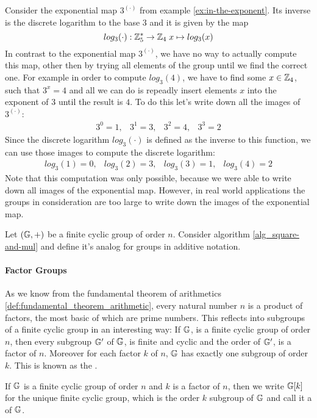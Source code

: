 \begin{example}Consider the exponential map $3^{(\cdot)}$ from example \ref{ex:in-the-exponent}. Its inverse is the discrete logarithm to the base $3$ and it is given by the map 
$$
log_3(\cdot): \mathbb{Z}_5^* \to \mathbb{Z}_4\; x \mapsto log_3(x)
$$ 
In contrast to the exponential map $3^{(\cdot)}$, we have no way to actually compute this map, other then by trying all elements of the group until we find the correct one. For example in order to compute $log_3(4)$, we have to find some $x\in \mathbb{Z}_4$, such that $3^x=4$ and all we can do is repeadly insert elements $x$ into the exponent of $3$ until the result is $4$. To do this let's write down all the images of $3^{(\cdot)}$: 
$$
\begin{array}{cccc}
3^0 = 1, & 3^1 = 3, & 3^2 = 4, & 3^3 = 2
\end{array}
$$
Since the discrete logarithm $log_3(\cdot)$ is defined as the inverse to this function, we can use those images to compute the discrete logarithm:
$$
\begin{array}{ccccc}
log_3(1) = 0, & log_3(2) = 3, & log_3(3) = 1, & log_3(4) = 2
\end{array}
$$
Note that this computation was only possible, because we were able to write down all images of the exponential map. However, in real world applications the groups in consideration are too large to write down the images of the exponential map. 
\end{example}
\begin{exercise} Let $(\mathbb{G},+)$ be a finite cyclic group of order $n$. Consider algorithm \ref{alg_square-and-mul} and define it's analog for groups in additive notation.
\end{exercise}
\paragraph{Factor Groups}
As we know from the fundamental theorem of arithmetics \ref{def:fundamental_theorem_arithmetic}, every natural number $n$ is a product of factors, the most basic of which are prime numbers. This reflects into subgroups of a finite cyclic group in an interesting way: If $\mathbb{G}$, is a finite cyclic group of order $n$, then every subgroup $\mathbb{G}'$ of $\mathbb{G}$, is finite and cyclic and the order of $\mathbb{G}'$, is a factor of $n$. Moreover for each factor $k$ of $n$, $\mathbb{G}$ has exactly one subgroup of order $k$. This is known as the \label{def:fundamental_theorem_groups}.
\begin{notation}If $\mathbb{G}$ is a finite cyclic group of order $n$ and $k$ is a factor of $n$, then we write $\mathbb{G}[k]$ for the unique finite cyclic group, which is the order $k$ subgroup of $\mathbb{G}$ and call it a  of $\mathbb{G}$.
\end{notation}

